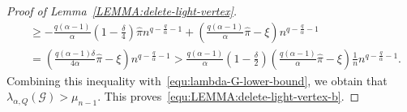\documentclass[11pt,a4paper]{article}
\begin{document}
\begin{proof}[Proof of Lemma~\ref{LEMMA:delete-light-vertex}]
\begin{align*}
        & \ge - \frac{q(\alpha-1)}{\alpha} \left(1-\frac{\delta}{4}\right) \hat{\pi} n^{q-\frac{q}{\alpha} -1}  + \left( \frac{q(\alpha-1)}{\alpha} \hat{\pi} - \xi \right) n^{q-\frac{q}{\alpha}-1}   \\
        & = \left(\frac{q(\alpha-1) \delta}{4 \alpha} \hat{\pi} - \xi \right) n^{q-\frac{q}{\alpha}-1} 
        > \frac{q(\alpha-1)}{\alpha} \left( 1-\frac{\delta}{2} \right) \left( \frac{q(\alpha-1)}{\alpha} \hat{\pi} - \xi \right)\frac{1}{n} n^{q-\frac{q}{\alpha}-1}.
    \end{align*}
    Combining this inequality with~\eqref{equ:lambda-G-lower-bound}, we obtain that $\lambda_{\alpha, Q}(\mathcal{G}) > \mu_{n-1}$.
    This proves~\eqref{equ:LEMMA:delete-light-vertex-b}. 
\end{proof}%

\end{document}

